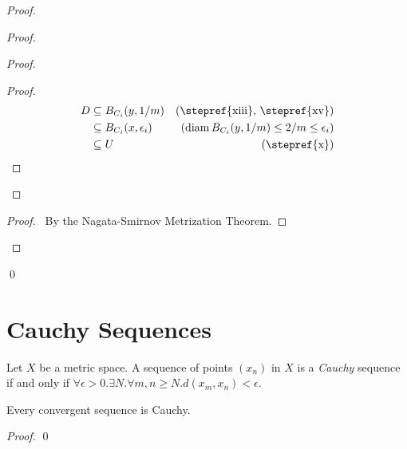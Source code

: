 \begin{proof}
\begin{proof}
\begin{proof}
            \begin{proof}
                \pf
                \begin{align*}
                    D & \subseteq B_{C_i}(y,1/m) & (\text{\stepref{xiii}, \stepref{xv}})\\
                    & \subseteq B_{C_i}(x,\epsilon_i) & (\diam B_{C_i}(y,1/m) \leq 2/m \leq \epsilon_i) \\
                    & \subseteq U & (\text{\stepref{x}})
                \end{align*}
            \end{proof}
        \end{proof}
        \qedstep
        \begin{proof}
            \pf\ By the Nagata-Smirnov Metrization Theorem.
        \end{proof}
    \end{proof}
    \qed
\end{proof}

\section{Cauchy Sequences}

\begin{definition}
    Let $X$ be a metric space. A sequence of points $(x_n)$ in $X$ is a \emph{Cauchy} sequence if and only if
    $\forall \epsilon > 0. \exists N. \forall m,n \geq N. d(x_m,x_n) < \epsilon$.
\end{definition}

\begin{proposition}
    Every convergent sequence is Cauchy.
\end{proposition}

\begin{proof}
    \pf
    \qed
\end{proof}

